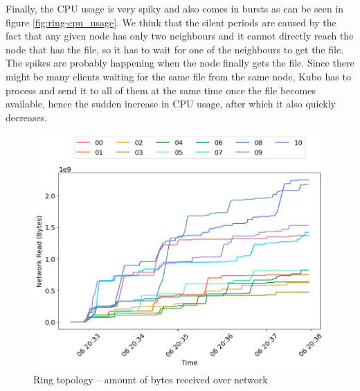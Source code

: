 Finally, the CPU usage is very spiky and also comes in bursts as can be seen in
figure \ref{fig:ring-cpu_usage}. We think that the silent periods are caused by
the fact that any given node has only two neighbours and it cannot directly
reach the node that has the file, so it has to wait for one of the neighbours
to get the file. The spikes are probably happening when the node finally gets
the file. Since there might be many clients waiting for the same file from the
same node, Kubo has to process and send it to all of them at the same time once
the file becomes available, hence the sudden increase in CPU usage, after which
it also quickly decreases.

\begin{minipage}{0.5\linewidth}
\begin{figure}[H]
\captionsetup{justification=centering,width=0.8\linewidth}
\includegraphics[width=\linewidth]{figures/ring/net_read.png}
\caption{Ring topology -- amount of bytes received over network}
\label{fig:ring-net_read}
\end{figure}
\end{minipage}
